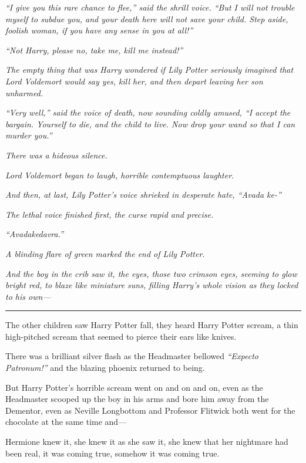 \emph{``I give you this rare chance to flee,'' said the shrill voice.
``But I will not trouble myself to subdue you, and your death here will
not save your child. Step aside, foolish woman, if you have any sense in
you at all!''}

\emph{``Not Harry, please no, take me, kill me instead!''}

\emph{The empty thing that was Harry wondered if Lily Potter seriously
imagined that Lord Voldemort would say yes, kill her, and then depart
leaving her son unharmed.}

\emph{``Very well,'' said the voice of death, now sounding coldly
amused, ``I accept the bargain. Yourself to die, and the child to live.
Now drop your wand so that I can murder you.''}

\emph{There was a hideous silence.}

\emph{Lord Voldemort began to laugh, horrible contemptuous laughter.}

\emph{And then, at last, Lily Potter's voice shrieked in desperate hate,
``Avada ke-''}

\emph{The lethal voice finished first, the curse rapid and precise.}

\emph{``Avadakedavra.''}

\emph{A blinding flare of green marked the end of Lily Potter.}

\emph{And the boy in the crib saw it, the eyes, those two crimson eyes,
seeming to glow bright red, to blaze like miniature suns, filling
Harry's whole vision as they locked to his own---}

\begin{center}\rule{3in}{0.4pt}\end{center}

The other children saw Harry Potter fall, they heard Harry Potter
scream, a thin high-pitched scream that seemed to pierce their ears like
knives.

There was a brilliant silver flash as the Headmaster bellowed
\emph{``Expecto Patronum!''} and the blazing phoenix returned to being.

But Harry Potter's horrible scream went on and on and on, even as the
Headmaster scooped up the boy in his arms and bore him away from the
Dementor, even as Neville Longbottom and Professor Flitwick both went
for the chocolate at the same time and---

Hermione knew it, she knew it as she saw it, she knew that her nightmare
had been real, it was coming true, somehow it was coming true.


